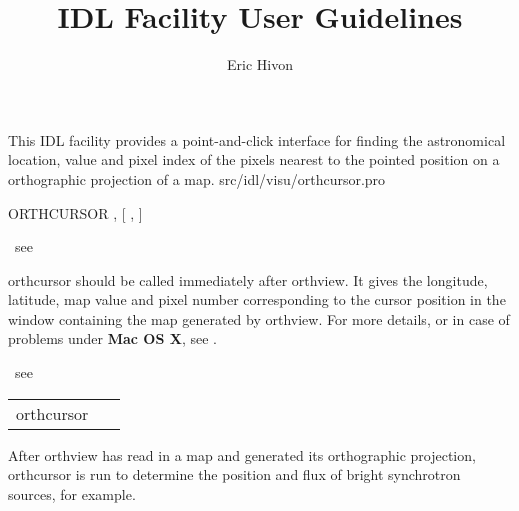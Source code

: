 




\sloppy



\title{\healpix IDL Facility User Guidelines}
 \section[orthcursor]{ }
\label{idl:\thedocid}
\author{Eric Hivon}


\begin{facility}
{This IDL facility provides a point-and-click interface for finding
the astronomical location, value and pixel index of the pixels nearest 
to the pointed position on a orthographic projection of a \healpix map.}
{src/idl/visu/orthcursor.pro}
\end{facility}

\begin{IDLformat}
{{ORTHCURSOR}%
, [%
, %
]}
\end{IDLformat}

\begin{qualifiers}
\hbox{\hspace{5cm}		see }
\end{qualifiers}

\begin{codedescription}
{orthcursor should be called immediately after orthview. It gives the longitude,
latitude, map value and pixel number
corresponding to the cursor position in the window containing the map generated
by orthview. For more details, or in case
of problems under {\bf Mac OS X}, see .}
\end{codedescription}



\begin{related}
\hbox{\hspace{5cm}	see }
\end{related}


\begin{example}
{
\begin{tabular}{ll} %
orthcursor & \ 
\end{tabular}
}
{After orthview has read in a map and generated
its orthographic projection, orthcursor is run to determine the
position and flux of bright synchrotron sources, for example.}
\end{example}



